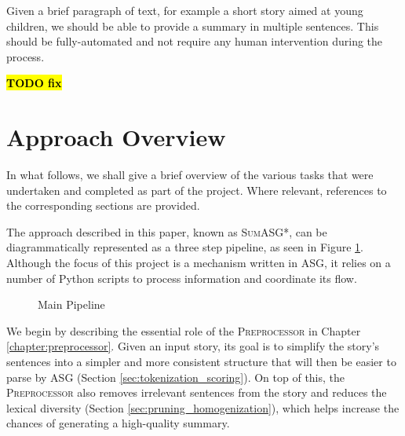 \begin{objective}
Given a brief paragraph of text, for example a short story aimed at young children, we should be able to provide a summary in multiple sentences. This should be fully-automated and not require any human intervention during the process.
\end{objective}

\begin{objective}

\end{objective}
 
\textcolor{red}{\textbf{\hl{TODO fix}}}

\section{Approach Overview}

In what follows, we shall give a brief overview of the various tasks that were undertaken and completed as part of the project. Where relevant, references to the corresponding sections are provided.

The approach described in this paper, known as \textsc{SumASG*}, can be diagrammatically represented as a three step pipeline, as seen in Figure \ref{fig:main_pipeline}. Although the focus of this project is a mechanism written in ASG, it relies on a number of Python scripts to process information and coordinate its flow.

\begin{figure}[H]
\centering
{}
\caption{Main Pipeline}
\label{fig:main_pipeline}
\end{figure}

We begin by describing the essential role of the \textsc{Preprocessor} in Chapter \ref{chapter:preprocessor}. Given an input story, its goal is to simplify the story's sentences into a simpler and more consistent structure that will then be easier to parse by ASG (Section \ref{sec:tokenization_scoring}). On top of this, the \textsc{Preprocessor} also removes irrelevant sentences from the story and reduces the lexical diversity (Section \ref{sec:pruning_homogenization}), which helps increase the chances of generating a high-quality summary.

